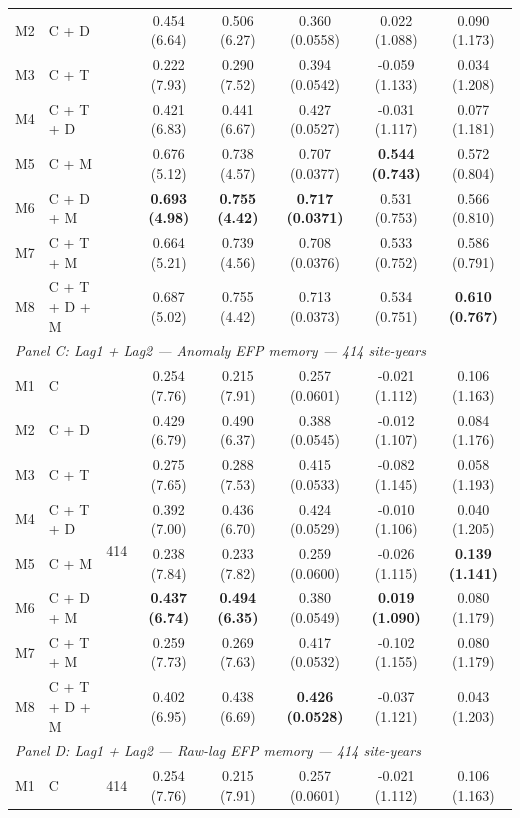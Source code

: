\begin{table}[htbp]
\begin{tabular}{llcccccc}
M2 & C + D &  & 0.454 (6.64) & 0.506 (6.27) & 0.360 (0.0558) & 0.022 (1.088) & 0.090 (1.173) \\
M3 & C + T &  & 0.222 (7.93) & 0.290 (7.52) & 0.394 (0.0542) & -0.059 (1.133) & 0.034 (1.208) \\
M4 & C + T + D &  & 0.421 (6.83) & 0.441 (6.67) & 0.427 (0.0527) & -0.031 (1.117) & 0.077 (1.181) \\
M5 & C + M &  & 0.676 (5.12) & 0.738 (4.57) & 0.707 (0.0377) & \textbf{0.544 (0.743)} & 0.572 (0.804) \\
M6 & C + D + M &  & \textbf{0.693 (4.98)} & \textbf{0.755 (4.42)} & \textbf{0.717 (0.0371)} & 0.531 (0.753) & 0.566 (0.810) \\
M7 & C + T + M &  & 0.664 (5.21) & 0.739 (4.56) & 0.708 (0.0376) & 0.533 (0.752) & 0.586 (0.791) \\
M8 & C + T + D + M &  & 0.687 (5.02) & 0.755 (4.42) & 0.713 (0.0373) & 0.534 (0.751) & \textbf{0.610 (0.767)} \\
\midrule
\multicolumn{8}{l}{\textit{Panel C: Lag1 + Lag2 --- Anomaly EFP memory --- 414 site-years}} \\
\midrule
M1 & C & \multirow{8}{*}{414} & 0.254 (7.76) & 0.215 (7.91) & 0.257 (0.0601) & -0.021 (1.112) & 0.106 (1.163) \\
M2 & C + D &  & 0.429 (6.79) & 0.490 (6.37) & 0.388 (0.0545) & -0.012 (1.107) & 0.084 (1.176) \\
M3 & C + T &  & 0.275 (7.65) & 0.288 (7.53) & 0.415 (0.0533) & -0.082 (1.145) & 0.058 (1.193) \\
M4 & C + T + D &  & 0.392 (7.00) & 0.436 (6.70) & 0.424 (0.0529) & -0.010 (1.106) & 0.040 (1.205) \\
M5 & C + M &  & 0.238 (7.84) & 0.233 (7.82) & 0.259 (0.0600) & -0.026 (1.115) & \textbf{0.139 (1.141)} \\
M6 & C + D + M &  & \textbf{0.437 (6.74)} & \textbf{0.494 (6.35)} & 0.380 (0.0549) & \textbf{0.019 (1.090)} & 0.080 (1.179) \\
M7 & C + T + M &  & 0.259 (7.73) & 0.269 (7.63) & 0.417 (0.0532) & -0.102 (1.155) & 0.080 (1.179) \\
M8 & C + T + D + M &  & 0.402 (6.95) & 0.438 (6.69) & \textbf{0.426 (0.0528)} & -0.037 (1.121) & 0.043 (1.203) \\
\midrule
\multicolumn{8}{l}{\textit{Panel D: Lag1 + Lag2 --- Raw-lag EFP memory --- 414 site-years}} \\
\midrule
M1 & C & \multirow{8}{*}{414} & 0.254 (7.76) & 0.215 (7.91) & 0.257 (0.0601) & -0.021 (1.112) & 0.106 (1.163) \\

\end{tabular}
\end{table}
